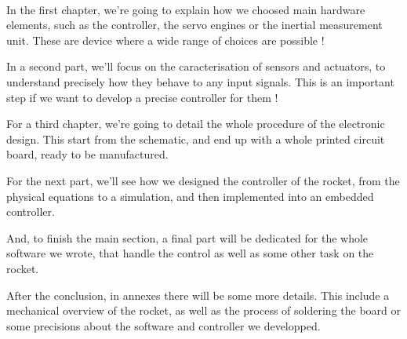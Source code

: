 \paragraph{}
In the first chapter, we're going to explain how we choosed main hardware
elements, such as the controller, the servo engines or the inertial measurement
unit. These are device where a wide range of choices are possible !

In a second part, we'll focus on the caracterisation of sensors and actuators,
to understand precisely how they behave to any input signals. This is an
important step if we want to develop a precise controller for them !

For a third chapter, we're going to detail the whole procedure of the
electronic design. This start from the schematic, and end up with a whole
printed circuit board, ready to be manufactured.

For the next part, we'll see how we designed the controller of the rocket, from
the physical equations to a simulation, and then implemented into an embedded
controller.

And, to finish the main section, a final part will be dedicated for the whole
software we wrote, that handle the control as well as some other task on the
rocket.

After the conclusion, in annexes there will be some more details. This include
a mechanical overview of the rocket, as well as the process of soldering the
board or some precisions about the software and controller we developped.

